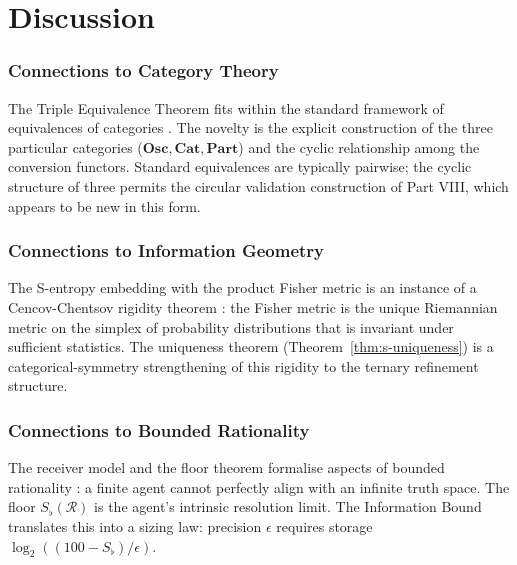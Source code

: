 \documentclass[twocolumn,a4paper]{article}
\newcommand{\receiver}{\mathcal{R}}
\newcommand{\Sfloor}{S_{\flat}}
\begin{document}
\part{Discussion}

\section{Connections to Category Theory}
\label{sec:cat-theory}

The Triple Equivalence Theorem fits within the standard framework of equivalences of categories \citep{maclane1998categories,borceux1994handbook}. The novelty is the explicit construction of the three particular categories ($\mathbf{Osc},\mathbf{Cat},\mathbf{Part}$) and the cyclic relationship among the conversion functors. Standard equivalences are typically pairwise; the cyclic structure of three permits the circular validation construction of Part VIII, which appears to be new in this form.

\section{Connections to Information Geometry}
\label{sec:info-geom}

The S-entropy embedding with the product Fisher metric is an instance of a Cencov-Chentsov rigidity theorem \citep{cencov2000statistical,amari2016information}: the Fisher metric is the unique Riemannian metric on the simplex of probability distributions that is invariant under sufficient statistics. The uniqueness theorem (Theorem~\ref{thm:s-uniqueness}) is a categorical-symmetry strengthening of this rigidity to the ternary refinement structure.

\section{Connections to Bounded Rationality}
\label{sec:bounded-rationality}

The receiver model and the floor theorem formalise aspects of bounded rationality \citep{simon1955behavioral,lipman1995information,gigerenzer1996reasoning}: a finite agent cannot perfectly align with an infinite truth space. The floor $\Sfloor(\receiver)$ is the agent's intrinsic resolution limit. The Information Bound translates this into a sizing law: precision $\epsilon$ requires storage $\log_{2}((100-\Sfloor)/\epsilon)$.
\end{document}
